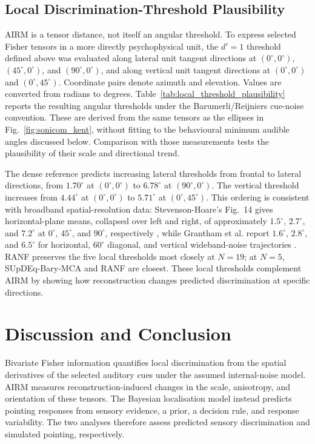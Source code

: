 \documentclass[journal]{IEEEtran}
\begin{document}
\subsection{Local Discrimination-Threshold Plausibility}
AIRM is a tensor distance, not itself an angular threshold. To express selected Fisher tensors in a more directly psychophysical unit, the \(d'=1\) threshold defined above was evaluated along lateral unit tangent directions at \((0^\circ,0^\circ)\), \((45^\circ,0^\circ)\), and \((90^\circ,0^\circ)\), and along vertical unit tangent directions at \((0^\circ,0^\circ)\) and \((0^\circ,45^\circ)\). Coordinate pairs denote azimuth and elevation. Values are converted from radians to degrees. Table~\ref{tab:local_threshold_plausibility} reports the resulting angular thresholds under the Barumerli/Reijniers cue-noise convention. These are derived from the same tensors as the ellipses in Fig.~\ref{fig:sonicom_kent}, without fitting to the behavioural minimum audible angles discussed below. Comparison with those measurements tests the plausibility of their scale and directional trend.



The dense reference predicts increasing lateral thresholds from frontal to lateral directions, from \(1.70^\circ\) at \((0^\circ,0^\circ)\) to \(6.78^\circ\) at \((90^\circ,0^\circ)\). The vertical threshold increases from \(4.44^\circ\) at \((0^\circ,0^\circ)\) to \(5.71^\circ\) at \((0^\circ,45^\circ)\). This ordering is consistent with broadband spatial-resolution data: Stevenson-Hoare's Fig.~14 gives horizontal-plane means, collapsed over left and right, of approximately \(1.5^\circ\), \(2.7^\circ\), and \(7.2^\circ\) at \(0^\circ\), \(45^\circ\), and \(90^\circ\), respectively \cite{StevensonHoare2020}, while Grantham et al. report \(1.6^\circ\), \(2.8^\circ\), and \(6.5^\circ\) for horizontal, \(60^\circ\) diagonal, and vertical wideband-noise trajectories \cite{Grantham2003}. RANF preserves the five local thresholds most closely at \(N=19\); at \(N=5\), SUpDEq-Bary-MCA and RANF are closest. These local thresholds complement AIRM by showing how reconstruction changes predicted discrimination at specific directions.
\section{Discussion and Conclusion}

Bivariate Fisher information quantifies local discrimination from the spatial derivatives of the selected auditory cues under the assumed internal-noise model. AIRM measures reconstruction-induced changes in the scale, anisotropy, and orientation of these tensors. The Bayesian localisation model instead predicts pointing responses from sensory evidence, a prior, a decision rule, and response variability. The two analyses therefore assess predicted sensory discrimination and simulated pointing, respectively.
\end{document}
